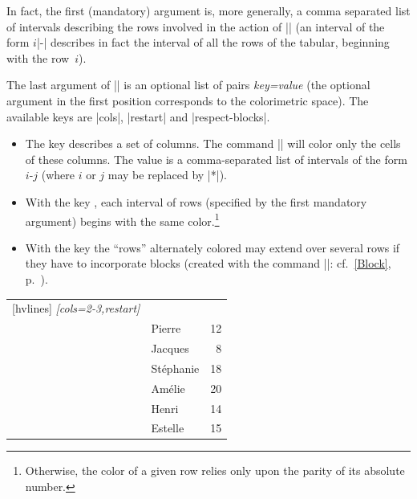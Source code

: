 \documentclass[dvipsnames]{article}
\begin{document}
\begin{itemize}
In fact, the first (mandatory) argument is, more generally, a comma separated
list of intervals describing the rows involved in the action of |\rowcolors|
(an interval of the form $i$|-| describes in fact the interval of all the rows
of the tabular, beginning with the row~$i$).


\bigskip
The last argument of |\rowcolors| is an optional list of pairs
\textsl{key=value} (the optional argument in the first position corresponds to
the colorimetric space). The available keys are |cols|, |restart| and
|respect-blocks|.


\begin{itemize}
\item The key  describes a set of columns. The command
|\rowcolors| will color only the cells of these columns. The value is a
comma-separated list of intervals of the form $i$-$j$ (where $i$ or $j$ may be
replaced by |*|).
\item With the key , each interval of rows (specified by the
first mandatory argument) begins with the same color.\footnote{Otherwise, the color
of a given row relies only upon the parity of its absolute number.}
\item With the key  the ``rows'' alternately colored
may extend over several rows if they have to incorporate blocks (created with
the command |\Block|: cf.~\ref{Block}, p.~\pageref{Block}).
\end{itemize}

\medskip
\medskip
\begin{Code}[width=10cm,show-output,no-cell-nodes]
\begin{NiceTabular}{clr}[hvlines]
\CodeBefore
  \emph{[cols=2-3,restart]}
\Body
   \\
  & Pierre & 12 \\
                & Jacques & 8 \\
  & Stéphanie & 18 \\
                & Amélie & 20 \\
                & Henri & 14 \\
                & Estelle & 15
\end{NiceTabular}
\end{Code}


\end{itemize}
\end{document}
